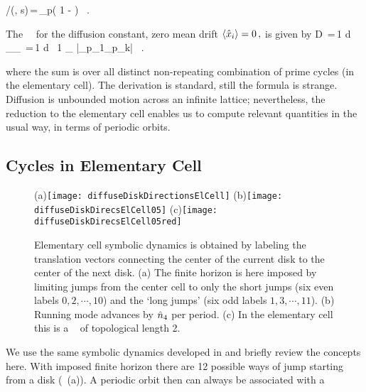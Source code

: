 \documentclass[aps,pre,showpacs,preprint,groupedaddress,floatfix]{revtex4-1}
\begin{document}
/\zeta(\beta, s)\,=\,\prod_{p}\left( 1 -  \right) ~.
\label{zeta-diff}
\eeq 

The \dzeta\ \cycForm\ for the diffusion constant, zero mean drift
$ \left\langle { \hat{x}_i } \right\rangle = 0 \,, $ is given by
 \beq D \,=\,{1  d}
{ _\zeta \over \expct{\period{}}_\zeta } \,=\,{1
   d } \, {1 \over \expct{\period{}}_\zeta} \sumprime
{}
{|\ExpaEig_{p_1}\cdots \ExpaEig_{p_k}|} \, .
\label{(17)}
\eeq 

where the sum is over all distinct non-repeating combination of
prime cycles (in the elementary cell). The derivation is standard,
still the formula is strange. Diffusion is unbounded motion across an
infinite lattice; nevertheless, the reduction to the elementary cell
enables us to compute relevant quantities in the usual way, in terms
of periodic orbits.

\subsection{Cycles in Elementary Cell}
\begin{figure}
  \begin{center}
    (a)\texttt{[image: diffuseDiskDirectionsElCell]}
    (b)\texttt{[image: diffuseDiskDirecsElCell05]}
    (c)\texttt{[image: diffuseDiskDirecsElCell05red]}
  \end{center}
  \caption{ Elementary cell symbolic dynamics is obtained by labeling
    the translation vectors connecting the center of the current disk
    to the center of the next disk. (a) The finite horizon is here
    imposed by limiting jumps from the center cell to only the short
    jumps (six even labels $0, 2,\cdots,10$) and the `long jumps' (six
    odd labels $1, 3,\cdots,11$). (b) Running mode  advances
    by $\hat n_4$ per period. (c) In the elementary cell this is a \po\
     of topological length 2.  }
  \label{fig-diskDirectionsElCell}
\end{figure}



We use the same symbolic dynamics developed in  and
briefly review the concepts here. With imposed finite horizon there
are 12 possible ways of jump starting from a disk (~(a)). A periodic orbit then can always be associated with a 
\end{document}
